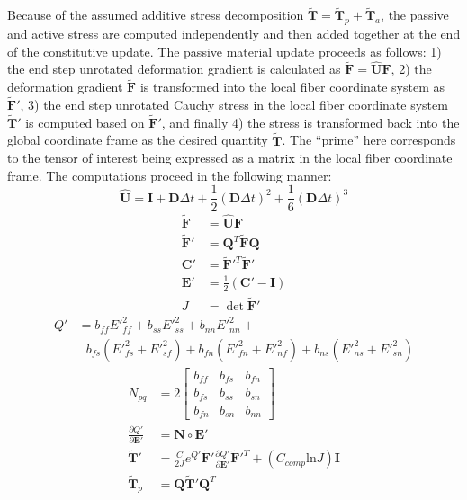 Because of the assumed additive stress decomposition $\tilde{\bm{T}} = \tilde{\bm{T}}_p + \tilde{\bm{T}}_a$, the passive and active stress are computed independently and then added together at the end of the constitutive update. The passive material update proceeds as follows: 1) the end step unrotated deformation gradient is calculated as $\tilde{\bm{F}} = \hat{\bm{U}}\bm{F}$, 2) the deformation gradient $\tilde{\bm{F}}$ is transformed into the local fiber coordinate system as $\tilde{\bm{F}}'$, 3) the end step unrotated Cauchy stress in the local fiber coordinate system $\tilde{\bm{T}}'$ is computed based on $\tilde{\bm{F}}'$, and finally 4) the stress is transformed back into the global coordinate frame as the desired quantity $\tilde{\bm{T}}$. The ``prime'' here corresponds to the tensor of interest being expressed as a matrix in the local fiber coordinate frame. The computations proceed in the following manner:
\begin{equation}
\hat{\bm{U}} = \bm{I} + \bm{D}\Delta{t} + \frac{1}{2}(\bm{D}\Delta{t})^2 + \frac{1}{6}(\bm{D}\Delta{t})^3
\end{equation}
\begin{align}
\tilde{\bm{F}} &= \hat{\bm{U}}\bm{F} \\
\tilde{\bm{F}}' &= \bm{Q}^T\tilde{\bm{F}}\bm{Q} \\
\bm{C}' &= \tilde{\bm{F}}'^T \tilde{\bm{F}}' \\
\bm{E}' &= \frac{1}{2}(\bm{C}' - \bm{I}) \\
J  &= \det{\tilde{\bm{F}}'}
\end{align}
\begin{equation}
\begin{aligned}
Q' &= b_{ff} E'^2_{ff} + b_{ss} E'^2_{ss} + b_{nn} E'^2_{nn} + \\
&\text{\ \ \ }b_{fs}\left(E'^2_{fs} + E'^2_{sf}\right) + b_{fn}\left(E'^2_{fn} + E'^2_{nf}\right) + b_{ns}\left(E'^2_{ns} + E'^2_{sn}\right)
\end{aligned}
\end{equation}
\begin{align}
N_{pq} &= 2 \left[\begin{array} {ccc} b_{ff} & b_{fs} & b_{fn} \\ b_{fs} & b_{ss} & b_{sn} \\ b_{fn} & b_{sn} & b_{nn} \end{array} \right] \\
\frac{\partial Q'}{\partial \bm{E}'} &= \bm{N} \circ \bm{E}' \\
\tilde{\bm{T}}' &= \frac{C}{2J}e^{Q'}\tilde{\bm{F}}'\frac{\partial{Q'}}{\partial{\bm{E}'}}\tilde{\bm{F}}'^T + (C_{comp}\text{ln}J)\bm{I} \\
\tilde{\bm{T}}_p &= \bm{Q} \tilde{\bm{T}}' \bm{Q}^T
\end{align}
